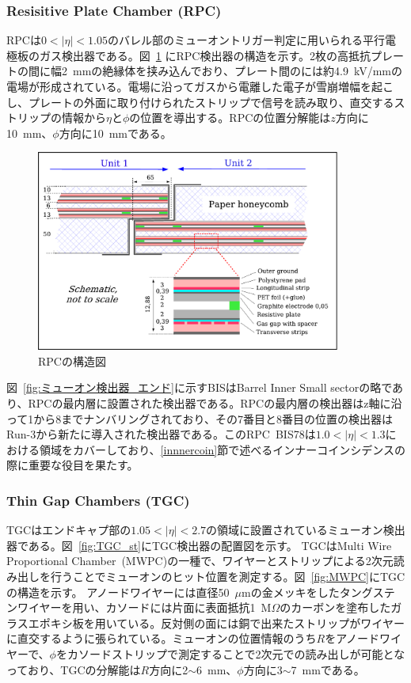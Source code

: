 \subsubsection{Resisitive Plate Chamber (RPC)}
RPCは$0 < |\eta| < 1.05$のバレル部のミューオントリガー判定に用いられる平行電極板のガス検出器である。図~\ref{fig:RPC} にRPC検出器の構造を示す。2枚の高抵抗プレートの間に幅2~mmの絶縁体を挟み込んでおり、プレート間のには約4.9~kV/mmの電場が形成されている。電場に沿ってガスから電離した電子が雪崩増幅を起こし、プレートの外面に取り付けられたストリップで信号を読み取り、直交するストリップの情報から$\eta$と$\phi$の位置を導出する。RPCの位置分解能は$z$方向に10~mm、$\phi$方向に10~mmである。

\begin{figure}[tb]
  \centering
  \includegraphics[clip, width=10cm]{fig/2/RPC_structure.pdf}
  \caption{RPCの構造図\cite{Aad:1129811}}
  \label{fig:RPC}
\end{figure}

図~\ref{fig:ミューオン検出器_エンド}に示すBISはBarrel Inner Small sectorの略であり、RPCの最内層に設置された検出器である。RPCの最内層の検出器はz軸に沿って1から8までナンバリングされており、その7番目と8番目の位置の検出器はRun-3から新たに導入された検出器である。このRPC~BIS78は$1.0 < |\eta| < 1.3$における領域をカバーしており、\ref{innnercoin}節で述べるインナーコインシデンスの際に重要な役目を果たす。

\subsubsection{Thin Gap Chambers (TGC)}
TGCはエンドキャプ部の$1.05 < |\eta| < 2.7$の領域に設置されているミューオン検出器である。図~\ref{fig:TGC_st}にTGC検出器の配置図を示す。
TGCはMulti Wire Proportional Chamber~(MWPC)の一種で、ワイヤーとストリップによる2次元読み出しを行うことでミューオンのヒット位置を測定する。図~\ref{fig:MWPC}にTGCの構造を示す。
アノードワイヤーには直径50~$\mu$mの金メッキをしたタングステンワイヤーを用い、カソードには片面に表面抵抗1~M$\Omega$のカーボンを塗布したガラスエポキシ板を用いている。反対側の面には銅で出来たストリップがワイヤーに直交するように張られている。ミューオンの位置情報のうち$R$をアノードワイヤーで、$\phi$をカソードストリップで測定することで2次元での読み出しが可能となっており、TGCの分解能は$R$方向に2$\sim$6~mm、$\phi$方向に3$\sim$7~mmである。

